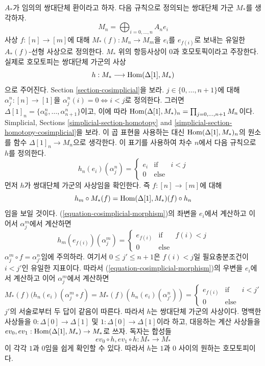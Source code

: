 \begin{example}
\label{example-cosimplicial-module}
$A_*$가 임의의 쌍대단체 환이라고 하자. 다음 규칙으로 정의되는
쌍대단체 가군 $M_*$를 생각하자.
$$
M_n = \bigoplus\nolimits_{i = 0, ..., n} A_n e_i
$$
사상 $f : [n] \to [m]$에 대해 $M_*(f) : M_n \to M_m$을
$e_i$를 $e_{f(i)}$로 보내는 유일한 $A_*(f)$-선형 사상으로
정의한다. $M_*$ 위의 항등사상이 $0$과 호모토픽이라고 주장한다.
실제로 호모토피는 쌍대단체 가군의 사상
$$
h : M_* \longrightarrow \mathop{\mathrm{Hom}}\nolimits(\Delta[1], M_*)
$$
으로 주어진다. Section \ref{section-cosimplicial}을 보라.
$j \in \{0, \ldots, n + 1\}$에 대해
$\alpha^n_j : [n] \to [1]$을
$\alpha^n_j(i) = 0 \Leftrightarrow i < j$로 정의한다. 그러면
$\Delta[1]_n = \{\alpha^n_0, \ldots, \alpha^n_{n + 1}\}$이고,
이에 따라
$\mathop{\mathrm{Hom}}\nolimits(\Delta[1], M_*)_n = \prod_{j = 0, \ldots, n + 1} M_n$이다.
Simplicial, Sections \ref{simplicial-section-homotopy} and
\ref{simplicial-section-homotopy-cosimplicial}을 보라. 이 곱 표현을
사용하는 대신 $\mathop{\mathrm{Hom}}\nolimits(\Delta[1], M_*)_n$의 원소를 함수
$\Delta[1]_n \to M_n$으로 생각한다. 이 표기를 사용하여 차수
$n$에서 다음 규칙으로 $h$를 정의한다.
$$
h_n(e_i)(\alpha^n_j) =
\left\{
\begin{matrix}
e_{i} & \text{if} & i < j \\
0 & \text{else}
\end{matrix}
\right.
$$
먼저 $h$가 쌍대단체 가군의 사상임을 확인한다. 즉
$f : [n] \to [m]$에 대해
\begin{equation}
\label{equation-cosimplicial-morphism}
h_m \circ M_*(f) = \mathop{\mathrm{Hom}}\nolimits(\Delta[1], M_*)(f) \circ h_n
\end{equation}
임을 보일 것이다. (\ref{equation-cosimplicial-morphism})의 좌변을
$e_i$에서 계산하고 이어서 $\alpha^m_j$에서 계산하면
$$
h_m(e_{f(i)})(\alpha^m_j) =
\left\{
\begin{matrix}
e_{f(i)} & \text{if} & f(i) < j \\
0 & \text{else}
\end{matrix}
\right.
$$
$\alpha^m_j \circ f = \alpha^n_{j'}$임에 주의하라. 여기서
$0 \leq j' \leq n + 1$은 $f(i) < j$일 필요충분조건이
$i < j'$인 유일한 지표이다. 따라서
(\ref{equation-cosimplicial-morphism})의 우변을 $e_i$에서 계산하고
이어 $\alpha^m_j$에서 계산하면
$$
M_*(f)(h_n(e_i)(\alpha^m_j \circ f) =
M_*(f)(h_n(e_i)(\alpha^n_{j'})) =
\left\{
\begin{matrix}
e_{f(i)} & \text{if} & i < j' \\
0 & \text{else}
\end{matrix}
\right.
$$
$j'$의 서술로부터 두 답이 같음이 따른다. 따라서 $h$는 쌍대단체
가군의 사상이다. 명백한 사상들을
$0 : \Delta[0] \to \Delta[1]$ 및
$1 : \Delta[0] \to \Delta[1]$이라 하고, 대응하는 계산 사상들을
$ev_0, ev_1 : \mathop{\mathrm{Hom}}\nolimits(\Delta[1], M_*) \to M_*$로 쓰자. 독자는 합성들
$$
ev_0 \circ h, ev_1 \circ h : M_* \longrightarrow M_*
$$
이 각각 $1$과 $0$임을 쉽게 확인할 수 있다. 따라서 $h$는
$1$과 $0$ 사이의 원하는 호모토피이다.
\end{example}

